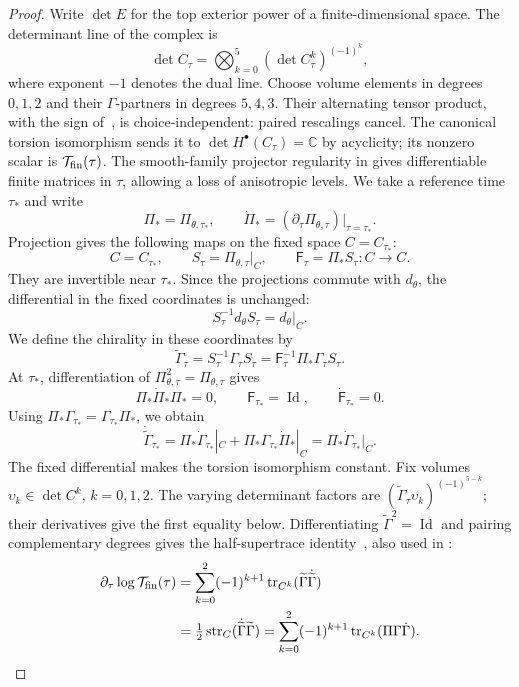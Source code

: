 \documentclass[11pt,letterpaper,reqno]{amsart}
\theoremstyle{remark}
\newcommand{\Id}{\operatorname{Id}}
\newcommand{\tr}{\operatorname{tr}}
\newcommand{\str}{\operatorname{str}}
\begin{document}
\begin{proof}
Write $\det E$ for the top exterior power of a finite-dimensional space.
The determinant line of the complex is
\[
 \det C_\tau=\bigotimes_{k=0}^5(\det C^k_\tau)^{(-1)^k},
\]
where exponent $-1$ denotes the dual line. Choose volume elements in
degrees $0,1,2$ and their $\Gamma$-partners in degrees $5,4,3$.
Their alternating tensor product, with the sign of~\cite[Section~3.3]{CD},
is choice-independent: paired rescalings cancel. The canonical torsion
isomorphism sends it to $\det H^\bullet(C_\tau)=\mathbb C$ by acyclicity;
its nonzero scalar is $\mathcal T_{\rm fin}(\tau)$.
The smooth-family projector regularity in
\cite[Proposition~7.2 and Appendix~B]{CD} gives differentiable
finite matrices in $\tau$, allowing a loss of anisotropic levels.
We take a reference time $\tau_*$ and write
\[
 \Pi_*=\Pi_{\theta,\tau_*},\qquad
 \dot\Pi_*=(\partial_\tau\Pi_{\theta,\tau})|_{\tau=\tau_*}.
\]
Projection gives the following maps on the fixed space $C=C_{\tau_*}$:
\[
 C=C_{\tau_*},\qquad S_\tau=\Pi_{\theta,\tau}|_C,
 \qquad \mathsf F_\tau=\Pi_*S_\tau:C\to C.
\]
They are invertible near $\tau_*$. Since the projections commute
with $d_\theta$, the differential in the fixed coordinates is unchanged:
\[
 S_\tau^{-1}d_\theta S_\tau=d_\theta|_C.
\]
We define the chirality in these coordinates by
\[
 \widetilde\Gamma_\tau
 =S_\tau^{-1}\Gamma_\tau S_\tau
 =\mathsf F_\tau^{-1}\Pi_*\Gamma_\tau S_\tau.
\]
At $\tau_*$, differentiation of $\Pi_{\theta,\tau}^2=\Pi_{\theta,\tau}$ gives
\[
 \Pi_*\dot\Pi_*\Pi_*=0,
 \qquad \mathsf F_{\tau_*}=\Id,\qquad\dot{\mathsf F}_{\tau_*}=0.
\]
Using $\Pi_*\Gamma_{\tau_*}=\Gamma_{\tau_*}\Pi_*$, we obtain
\[
 \dot{\widetilde\Gamma}_{\tau_*}
 =\Pi_*\dot\Gamma_{\tau_*}|_C
   +\Pi_*\Gamma_{\tau_*}\dot\Pi_*|_C
 =\Pi_*\dot\Gamma_{\tau_*}|_C.
\]
The fixed differential makes the torsion isomorphism constant.
Fix volumes $\upsilon_k\in\det C^k$, $k=0,1,2$.
The varying determinant factors are
$(\widetilde\Gamma_\tau\upsilon_k)^{(-1)^{5-k}}$; their derivatives give
the first equality below.
Differentiating $\widetilde\Gamma^2=\Id$ and pairing complementary degrees
gives the half-supertrace identity~\cite[Proposition~4.9]{BK}, also used in
\cite[Lemma~7.3]{CD}:
\begin{equation}\label{xp:chirality-derivative}
 \begin{aligned}
 \partial_\tau\log\mathcal T_{\rm fin}(\tau)
 &=\sum_{k=0}^{2}(-1)^{k+1}
       \tr_{C^k}(\widetilde\Gamma\dot{\widetilde\Gamma})\\
 &=\tfrac12\str_C(\dot{\widetilde\Gamma}\widetilde\Gamma)
   =\sum_{k=0}^{2}(-1)^{k+1}\tr_{C^k}(\Pi\Gamma\dot\Gamma).
 \end{aligned}
\end{equation}


\end{proof}
\end{document}
